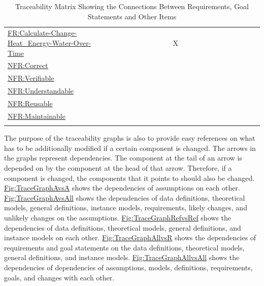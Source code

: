 \documentclass[12pt]{article}
\begin{document}
\begin{longtable}{l l l l l l l l l l l l l l l l l l l l l l l}
\\
\hyperref[calcChgHeatEnergyWtrOverTime]{FR:Calculate-Change-Heat\_Energy-Water-Over-Time} &  &  &  &  &  &  &  &  &  &  & X &  &  &  &  &  &  &  &  &  &  & 
\\
\hyperref[correct]{NFR:Correct} &  &  &  &  &  &  &  &  &  &  &  &  &  &  &  &  &  &  &  &  &  & 
\\
\hyperref[verifiable]{NFR:Verifiable} &  &  &  &  &  &  &  &  &  &  &  &  &  &  &  &  &  &  &  &  &  & 
\\
\hyperref[understandable]{NFR:Understandable} &  &  &  &  &  &  &  &  &  &  &  &  &  &  &  &  &  &  &  &  &  & 
\\
\hyperref[reusable]{NFR:Reusable} &  &  &  &  &  &  &  &  &  &  &  &  &  &  &  &  &  &  &  &  &  & 
\\
\hyperref[maintainable]{NFR:Maintainable} &  &  &  &  &  &  &  &  &  &  &  &  &  &  &  &  &  &  &  &  &  & 
\\
\bottomrule
\caption{Traceability Matrix Showing the Connections Between Requirements, Goal Statements and Other Items}
\label{Table:TraceMatAllvsR}
\end{longtable}
The purpose of the traceability graphs is also to provide easy references on what has to be additionally modified if a certain component is changed. The arrows in the graphs represent dependencies. The component at the tail of an arrow is depended on by the component at the head of that arrow. Therefore, if a component is changed, the components that it points to should also be changed. \hyperref[Figure:TraceGraphAvsA]{Fig:TraceGraphAvsA} shows the dependencies of assumptions on each other. \hyperref[Figure:TraceGraphAvsAll]{Fig:TraceGraphAvsAll} shows the dependencies of data definitions, theoretical models, general definitions, instance models, requirements, likely changes, and unlikely changes on the assumptions. \hyperref[Figure:TraceGraphRefvsRef]{Fig:TraceGraphRefvsRef} shows the dependencies of data definitions, theoretical models, general definitions, and instance models on each other. \hyperref[Figure:TraceGraphAllvsR]{Fig:TraceGraphAllvsR} shows the dependencies of requirements and goal statements on the data definitions, theoretical models, general definitions, and instance models. \hyperref[Figure:TraceGraphAllvsAll]{Fig:TraceGraphAllvsAll} shows the dependencies of dependencies of assumptions, models, definitions, requirements, goals, and changes with each other.
\end{document}
